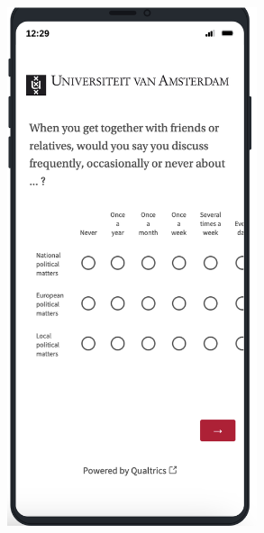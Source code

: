 \documentclass[aspectratio=169]{beamer}
\begin{document}
\begin{frame}

\begin{column}{0.45\textwidth}
\begin{center}
\includegraphics[width=0.55\textwidth]{figures/mobile-matrix.png}
\end{center}
\end{column}
\begin{column}{0.45\textwidth}
\begin{center}

\end{center}
\end{column}
\end{frame}
\end{document}
